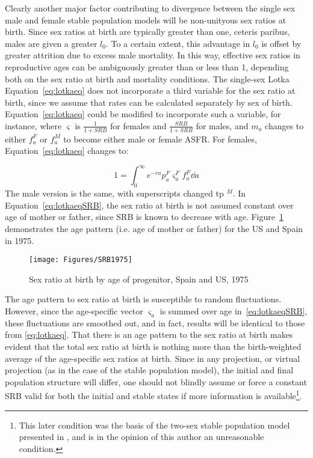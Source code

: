  \FloatBarrier
Clearly another major factor contributing to divergence between the single sex
male and female stable population models will be non-unityous sex ratios at
birth. Since sex ratios at birth are typically greater than one, ceteris paribus, males
are given a greater $l_0$. To a certain extent, this advantage in $l_0$ is
offset by greater attrition due to excess male mortality. In this way, effective
sex ratios in reproductive ages can be ambiguously greater than or less than 1,
depending both on the sex ratio at birth and mortality conditions. The
single-sex Lotka Equation~\eqref{eq:lotkaeq} does not incorporate a third
variable for the sex ratio at birth, since we assume that rates can be
calculated separately by sex of birth. Equation~\eqref{eq:lotkaeq} could be
modified to incorporate such a variable, for instance, where $\varsigma$ is
$\tfrac{1}{1+SRB}$ for females and $\tfrac{SRB}{1+SRB}$ for males, and $m_a$
changes to either $f_a^F$ or $f_a^M$ to become either male or female ASFR. For
females, Equation~\ref{eq:lotkaeq} changes to:

\begin{equation}
\label{eq:lotkaeqSRB}
1 = \int _0 ^\infty e^{-ra}p_a^F \varsigma_a^F f_a^F \dd a 
\end{equation}
The male version is the same, with superscripts changed tp $^M$. In
Equation~\eqref{eq:lotkaeqSRB}, the sex ratio at birth is not assumed constant 
over age of mother or father, since SRB is known to decrease with age.
Figure~\ref{fig:SRB1975} demonstrates the age pattern (i.e. age of mother or
father) for the US and Spain in 1975.

\begin{figure}[ht!]
        \centering  
          \caption{Sex ratio at birth by age of progenitor, Spain
          and US, 1975}
           \texttt{[image: Figures/SRB1975]}
          \label{fig:SRB1975}
\end{figure}

The age pattern to sex ratio at birth is susceptible to random
fluctuations. However, since the age-specific vector $\varsigma _a$ is summed
over age in~\eqref{eq:lotkaeqSRB}, these fluctuations are smoothed out, and in
fact, results will be identical to those from \eqref{eq:lotkaeq}. That there is
an age pattern to the sex ratio at birth makes evident that the total sex ratio 
at birth is nothing more than the birth-weighted
average of the age-specific sex ratios at birth. Since in any projection, or virtual projection
(as in the case of the stable population model), the initial and final population structure will differ, one should not blindly assume or force a constant SRB valid for both the initial and stable states
if more information is available\footnote{This later condition was the basis of
the two-sex stable population model presented in \citet{mitra1982alternative,mitra1978derivation,mitra1976effect}, and is in the
opinion of this author an unreasonable condition.}.

